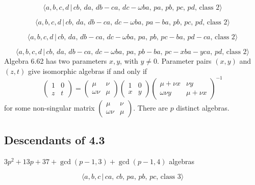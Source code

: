 \documentclass[10pt]{article}
\begin{document}
\begin{equation}
\langle a,b,c,d\,|\,cb,\,da,\,db-ca,\,dc-\omega ba,\,pa,\,pb,\,pc,\,pd,\,%
\text{class }2\rangle  \tag{6.60}
\end{equation}

\begin{equation}
\langle a,b,c,d\,|\,cb,\,da,\,db-ca,\,dc-\omega ba,\,pa-ba,\,pb,\,pc,\,pd,\,%
\text{class }2\rangle  \tag{6.60B}
\end{equation}

\begin{equation}
\langle a,b,c,d\,|\,cb,\,da,\,db-ca,\,dc-\omega
ba,\,pa,\,pb,\,pc-ba,\,pd-ca,\,\text{class }2\rangle  \tag{6.61}
\end{equation}

\begin{equation}
\langle a,b,c,d\,|\,cb,\,da,\,db-ca,\,dc-\omega
ba,\,pa,\,pb-ba,\,pc-xba-yca,\,pd,\,\text{class }2\rangle  \tag{6.62}
\end{equation}%
Algebra 6.62 has two parameters $x,y$, with $y\neq 0$. Parameter pairs $%
(x,y) $ and $(z,t)$ give isomorphic algebras if and only if%
\[
\left( 
\begin{array}{ll}
1 & 0 \\ 
z & t%
\end{array}%
\right) =\left( 
\begin{array}{ll}
\mu & \nu \\ 
\omega \nu & \mu%
\end{array}%
\right) \left( 
\begin{array}{ll}
1 & 0 \\ 
x & y%
\end{array}%
\right) \left( 
\begin{array}{ll}
\mu +\nu x & \nu y \\ 
\omega \nu y & \mu +\nu x%
\end{array}%
\right) ^{-1} 
\]%
for some non-singular matrix $\left( 
\begin{array}{ll}
\mu & \nu \\ 
\omega \nu & \mu%
\end{array}%
\right) $. There are $p$ distinct algebras.

\subsection{Descendants of 4.3}

$3p^{2}+13p+37+\gcd (p-1,3)+\gcd (p-1,4)$ algebras

\begin{equation}
\langle a,b,c\,|\,ca,\,cb,\,pa,\,pb,\,pc,\,\text{class }3\rangle  \tag{6.118}
\end{equation}
\end{document}
